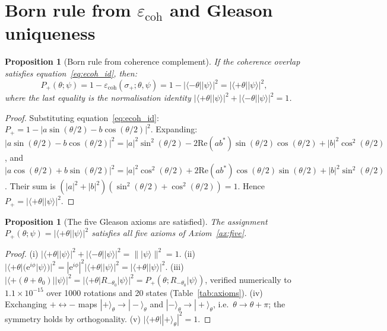 \documentclass[11pt,a4paper]{article}
\newtheorem{proposition}[theorem]{Proposition}
\theoremstyle{definition}
\newcommand{\ecoh}{\varepsilon_{\mathrm{coh}}}
\newcommand{\pket}[1]{|#1\rangle}
\newcommand{\pbra}[1]{\langle#1|}
\begin{document}
\section{Born rule from \texorpdfstring{$\ecoh$}{ecoh} and Gleason uniqueness}
\label{sec:born}

\begin{proposition}[Born rule from coherence complement]
\label{prop:born_from_ecoh}
If the coherence overlap satisfies equation~\eqref{eq:ecoh_id}, then:
\begin{equation}
P_+(\theta;\psi) = 1 - \ecoh(\sigma_+;\theta,\psi) = 1 - \bigl|\pbra{-\theta}\pket{\psi}\bigr|^2 = \bigl|\pbra{+\theta}\pket{\psi}\bigr|^2,
\label{eq:born_from_ecoh}
\end{equation}
where the last equality is the normalisation identity $|\pbra{+\theta}\pket{\psi}|^2 + |\pbra{-\theta}\pket{\psi}|^2 = 1$.
\end{proposition}

\begin{proof}
Substituting equation~\eqref{eq:ecoh_id}: $P_+ = 1 - |a\sin(\theta/2) - b\cos(\theta/2)|^2$. Expanding: $|a\sin(\theta/2) - b\cos(\theta/2)|^2 = |a|^2\sin^2(\theta/2) - 2\mathrm{Re}(ab^*)\sin(\theta/2)\cos(\theta/2) + |b|^2\cos^2(\theta/2)$, and $|a\cos(\theta/2) + b\sin(\theta/2)|^2 = |a|^2\cos^2(\theta/2) + 2\mathrm{Re}(ab^*)\cos(\theta/2)\sin(\theta/2) + |b|^2\sin^2(\theta/2)$. Their sum is $(|a|^2+|b|^2)(\sin^2(\theta/2)+\cos^2(\theta/2)) = 1$. Hence $P_+ = |\pbra{+\theta}\pket{\psi}|^2$.
\end{proof}

\begin{proposition}[The five Gleason axioms are satisfied]
\label{prop:axioms}
The assignment $P_+(\theta;\psi) = |\pbra{+\theta}\pket{\psi}|^2$ satisfies all five axioms of Axiom~\ref{ax:five}.
\end{proposition}

\begin{proof}
(i) $|\pbra{+\theta}\pket{\psi}|^2 + |\pbra{-\theta}\pket{\psi}|^2 = \|\pket{\psi}\|^2 = 1$. (ii) $|\pbra{+\theta}(\mathrm{e}^{i\phi}\pket{\psi})|^2 = |\mathrm{e}^{i\phi}|^2|\pbra{+\theta}\pket{\psi}|^2 = |\pbra{+\theta}\pket{\psi}|^2$. (iii) $|\pbra{+(\theta+\theta_0)}\pket{\psi}|^2 = |\pbra{+\theta}R_{-\theta_0}\pket{\psi}|^2 = P_+(\theta; R_{-\theta_0}\pket{\psi})$, verified numerically to $1.1\times10^{-15}$ over 1000 rotations and 20 states (Table~\ref{tab:axioms}). (iv) Exchanging $+\leftrightarrow-$ maps $\pket{+}_\theta\to\pket{-}_\theta$ and $\pket{-}_\theta\to\pket{+}_\theta$, i.e.\ $\theta\to\theta+\pi$; the symmetry holds by orthogonality. (v) $|\pbra{+\theta}\pket{+}_\theta|^2 = 1$.
\end{proof}
\end{document}
